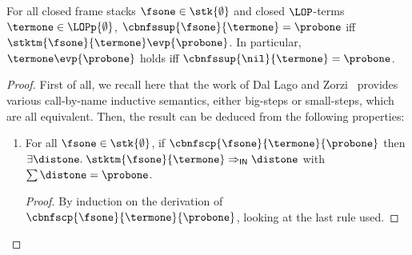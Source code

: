 \begin{lemma}\label{lemma:ciuctxeq}
  For all closed frame stacks $\fsone\in\stk{\emptyset}$ and closed
  $\LOP$-terms $\termone\in\LOPp{\emptyset}$,
  $\cbnfssup{\fsone}{\termone}=\probone$ iff
  $\stktm{\fsone}{\termone}\evp{\probone}$. In particular,
  $\termone\evp{\probone}$ holds iff $\cbnfssup{\nil}{\termone}=\probone$.
\end{lemma}
\begin{proof}
First of all, we recall here that the work of Dal Lago and
  Zorzi~\cite{DalLagoZorzi} provides various call-by-name inductive
  semantics, either big-steps or small-steps, which are all equivalent. 
  Then, the result can be deduced from the following properties:
  \begin{enumerate}
\item For all $\fsone\in\stk{\emptyset}$, if
    $\cbnfscp{\fsone}{\termone}{\probone}$ then
    $\exists\distone.\;\ssemn{\stktm{\fsone}{\termone}}{\distone}$ with
    $\sum\distone=\probone$.
    \begin{proof}
      By induction on the derivation of
      $\cbnfscp{\fsone}{\termone}{\probone}$, looking at the last rule
      used.
\end{proof}
\end{enumerate}
\end{proof}

